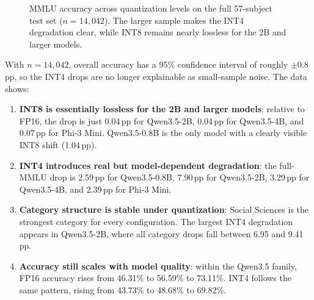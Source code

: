 \documentclass[journal]{IEEEtran}
\begin{document}
\begin{figure}[htbp]
\centering
{}
\caption{MMLU accuracy across quantization levels on the full 57-subject test set ($n=14{,}042$). The larger sample makes the INT4 degradation clear, while INT8 remains nearly lossless for the 2B and larger models.}
\label{fig:mmlu_accuracy}
\end{figure}

With $n=14{,}042$, overall accuracy has a 95\% confidence interval of roughly $\pm 0.8$\,pp, so the INT4 drops are no longer explainable as small-sample noise. The data shows:

\begin{enumerate}[leftmargin=*,nosep]
    \item \textbf{INT8 is essentially lossless for the 2B and larger models}: relative to FP16, the drop is just 0.04\,pp for Qwen3.5-2B, 0.04\,pp for Qwen3.5-4B, and 0.07\,pp for Phi-3 Mini. Qwen3.5-0.8B is the only model with a clearly visible INT8 shift (1.04\,pp).

    \item \textbf{INT4 introduces real but model-dependent degradation}: the full-MMLU drop is 2.59\,pp for Qwen3.5-0.8B, 7.90\,pp for Qwen3.5-2B, 3.29\,pp for Qwen3.5-4B, and 2.39\,pp for Phi-3 Mini.

    \item \textbf{Category structure is stable under quantization}: Social Sciences is the strongest category for every configuration. The largest INT4 degradation appears in Qwen3.5-2B, where all category drops fall between 6.95 and 9.41\,pp.

    \item \textbf{Accuracy still scales with model quality}: within the Qwen3.5 family, FP16 accuracy rises from 46.31\% to 56.59\% to 73.11\%. INT4 follows the same pattern, rising from 43.73\% to 48.68\% to 69.82\%.
\end{enumerate}
\end{document}

